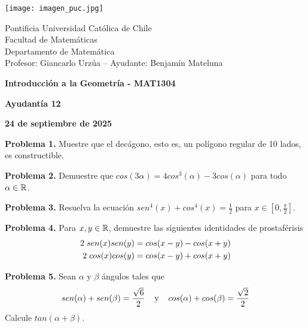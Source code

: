 \documentclass{article}
\begin{document}
\begin{minipage}{2.5cm}
    \texttt{[image: imagen\_puc.jpg]}
\end{minipage}
\begin{minipage}{14cm}
    {\sc Pontificia Universidad Católica de Chile\\
    Facultad de Matemáticas\\
    Departamento de Matemática\\
    Profesor: Giancarlo Urzúa -- Ayudante: Benjamín Mateluna}
\end{minipage}
\vspace{1ex}

{\centerline{\bf Introducción a la Geometría - MAT1304}
\centerline{\bf Ayudantía 12}}
\centerline{\bf 24 de septiembre de 2025}

\vspace{1cm}
\noindent\textbf{Problema 1.} Muestre que el decágono, esto es, un polígono regular de 10 lados,
es constructible.

\vspace{5mm}
\noindent\textbf{Problema 2.} Demuestre que $cos(3\alpha)=4cos^{3}(\alpha)-3cos(\alpha)$ para todo 
$\alpha\in\mathbb{R}$.

\vspace{5mm}
\noindent\textbf{Problema 3.} Resuelva la ecuación $sen^{4}(x)+cos^{4}(x)=\frac{1}{2}$ para 
$x\in[0,\frac{\pi}{2}]$.

\vspace{5mm}
\noindent\textbf{Problema 4.} Para $x,y\in\mathbb{R}$, demuestre las siguientes identidades de 
prostaférisis
\begin{align*}
    2\hspace{1mm}sen(x)sen(y) &= cos(x-y)-cos(x+y) \\
    2\hspace{1mm}cos(x)cos(y) &= cos(x-y)+cos(x+y)
\end{align*}

\vspace{5mm}
\noindent\textbf{Problema 5.} Sean $\alpha$ y $\beta$ ángulos tales que
\begin{equation*}
    sen(\alpha)+sen(\beta)=\frac{\sqrt{6}}{2}\hspace{4mm}\text{y}\hspace{4mm}
    cos(\alpha)+cos(\beta)=\frac{\sqrt{2}}{2}
\end{equation*}
Calcule $tan(\alpha+\beta)$.

\end{document}
